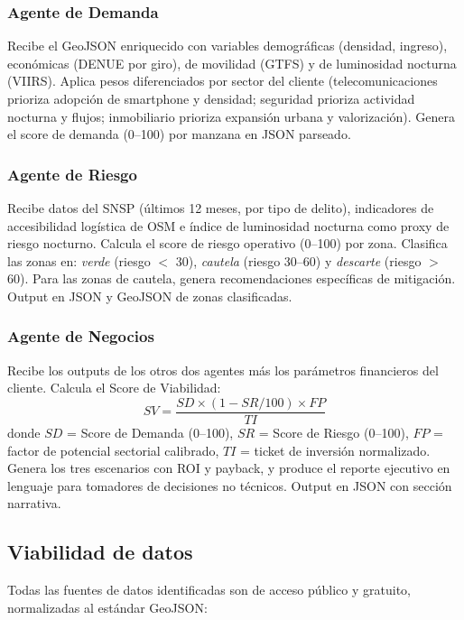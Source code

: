 \documentclass[12pt,a4paper]{article}
\begin{document}
\subsubsection{Agente de Demanda}

Recibe el GeoJSON enriquecido con variables demográficas (densidad, ingreso), económicas (DENUE por giro), de movilidad (GTFS) y de luminosidad nocturna (VIIRS). Aplica pesos diferenciados por sector del cliente (telecomunicaciones prioriza adopción de smartphone y densidad; seguridad prioriza actividad nocturna y flujos; inmobiliario prioriza expansión urbana y valorización). Genera el score de demanda (0–100) por manzana en JSON parseado.

\subsubsection{Agente de Riesgo}

Recibe datos del SNSP (últimos 12 meses, por tipo de delito), indicadores de accesibilidad logística de OSM e índice de luminosidad nocturna como proxy de riesgo nocturno. Calcula el score de riesgo operativo (0–100) por zona. Clasifica las zonas en: \textit{verde} (riesgo $<$ 30), \textit{cautela} (riesgo 30–60) y \textit{descarte} (riesgo $>$ 60). Para las zonas de cautela, genera recomendaciones específicas de mitigación. Output en JSON y GeoJSON de zonas clasificadas.

\subsubsection{Agente de Negocios}

Recibe los outputs de los otros dos agentes más los parámetros financieros del cliente. Calcula el Score de Viabilidad:
\[
SV = \frac{SD \times (1 - SR/100) \times FP}{TI}
\]
donde $SD$ = Score de Demanda (0–100), $SR$ = Score de Riesgo (0–100), $FP$ = factor de potencial sectorial calibrado, $TI$ = ticket de inversión normalizado. Genera los tres escenarios con ROI y payback, y produce el reporte ejecutivo en lenguaje para tomadores de decisiones no técnicos. Output en JSON con sección narrativa.

\subsection{Viabilidad de datos}

Todas las fuentes de datos identificadas son de acceso público y gratuito, normalizadas al estándar GeoJSON:
\end{document}
